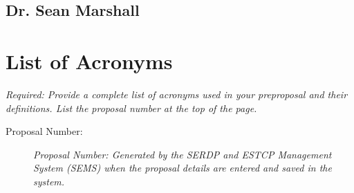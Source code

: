 \documentclass[11pt,english,letterpaper]{scrartcl}
\begin{document}
\subsection{Dr. Sean Marshall}

\section{List of Acronyms}

\textit{Required: Provide a complete list of acronyms used in your preproposal and their definitions. List the proposal number at the top of the page.} \\

\begin{description}
	\item[Proposal Number:] \emph{Proposal Number: Generated by the SERDP and ESTCP Management System (SEMS) when the proposal details are entered and saved in the system.}
\end{description}
\end{document}
